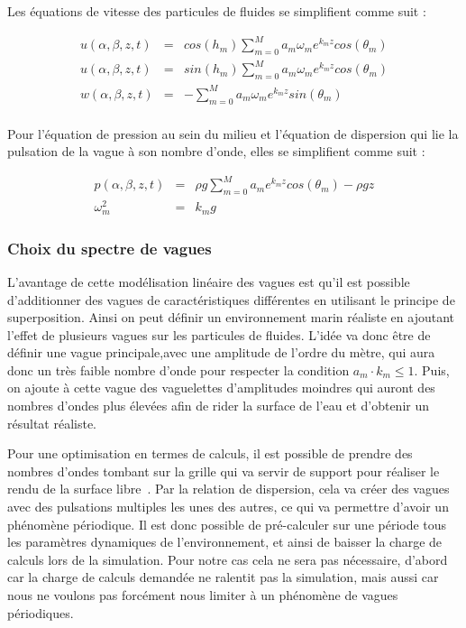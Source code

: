 				Les équations de vitesse des particules de fluides se simplifient comme suit :

				\begin{eqnarray}
					u(\alpha, \beta, z, t) & = & cos(h_m) \sum_{m=0}^M a_m \omega_m e^{k_mz} cos(\theta_m) \\
					u(\alpha, \beta, z, t) & = & sin(h_m) \sum_{m=0}^M a_m \omega_m e^{k_mz} cos(\theta_m) \\
					w(\alpha, \beta, z, t) & = & - \sum_{m=0}^M a_m \omega_m e^{k_mz} sin(\theta_m) \\
				\end{eqnarray}

				Pour l'équation de pression au sein du milieu et l'équation de dispersion qui lie la pulsation de la vague à son nombre d'onde, elles se simplifient comme suit :

				\begin{eqnarray}
					p(\alpha, \beta, z, t) & = & \rho g \sum_{m=0}^M a_m e^{k_mz} cos(\theta_m) - \rho g z\\
					\omega_m^2 & = & k_m g \label{equation:deep_dispersion}
				\end{eqnarray}

			\subsubsection{Choix du spectre de vagues}

				L'avantage de cette modélisation linéaire des vagues est qu'il est possible d'additionner des vagues de caractéristiques différentes en utilisant le principe de superposition. Ainsi on peut définir un environnement marin réaliste en ajoutant l'effet de plusieurs vagues sur les particules de fluides. L'idée va donc être de définir une vague principale,avec une amplitude de l'ordre du mètre, qui aura donc un très faible nombre d'onde pour respecter la condition $a_m \cdot k_m \le 1$. Puis, on ajoute à cette vague des vaguelettes d'amplitudes moindres qui auront des nombres d'ondes plus élevées afin de rider la surface de l'eau et d'obtenir un résultat réaliste.

				Pour une optimisation en termes de calculs, il est possible de prendre des nombres d'ondes tombant sur la grille qui va servir de support pour réaliser le rendu de la surface libre~\cite{tessendorf2001simulating}. Par la relation de dispersion, cela va créer des vagues avec des pulsations multiples les unes des autres, ce qui va permettre d'avoir un phénomène périodique. Il est donc possible de pré-calculer sur une période tous les paramètres dynamiques de l'environnement, et ainsi de baisser la charge de calculs lors de la simulation. Pour notre cas cela ne sera pas nécessaire, d'abord car la charge de calculs demandée ne ralentit pas la simulation, mais aussi car nous ne voulons pas forcément nous limiter à un phénomène de vagues périodiques.
			
